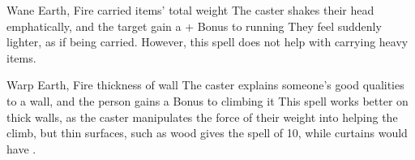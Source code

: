 \ifodd\value{diceNo}

  {}%
  {Wane}%
  {Earth, Fire}%
  {carried items' total \gls{weight}}%
  {The caster shakes their head emphatically, and the target gain a + Bonus to running}%
  {They feel suddenly lighter, as if being carried.
  However, this spell does not help with carrying heavy items.}

\else

  {}%
  {Warp}%
  {Earth, Fire}%
  {thickness of wall}%
  {The caster explains someone's good qualities to a wall, and the person gains a  Bonus to climbing it}%
  {
  This spell works better on thick walls, as the caster manipulates the force of their weight into helping the climb, but thin surfaces, such as wood gives the spell  of 10, while curtains would have \tn[12].}

\fi
{}
